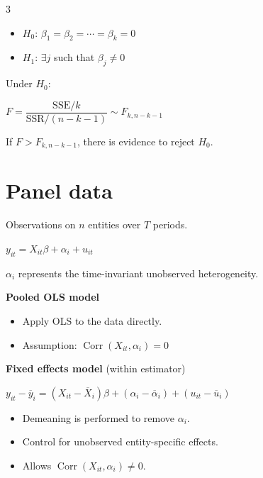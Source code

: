 \documentclass[10pt, a4paper, landscape]{article}
\DeclareMathOperator{\Corr}{Corr}
\newcommand{\SSR}{\text{SSR}}
\newcommand{\SSE}{\text{SSE}}
\begin{document}
\begin{multicols}{3}
\begin{itemize}[leftmargin=*]
	\item \( H_{0} \): \( \beta_{1} = \beta_{2} = \cdots = \beta_{k} = 0 \)
	\item \( H_{1} \): \( \exists j \) such that \( \beta_{j} \neq 0 \)
\end{itemize}

Under \( H_{0} \):

\begin{center}
	\( F = \dfrac{\SSE / k}{\SSR / (n - k - 1)} \sim F_{k, n - k - 1} \)
\end{center}

If \( F > F_{k, n - k - 1} \), there is evidence to reject \( H_{0} \).

\columnbreak

\section*{Panel data}

Observations on \( n \) entities over \( T \) periods.

\begin{center}
	\( y_{it} = X_{it} \beta + \alpha_{i} + u_{it} \)
\end{center}

\( \alpha_{i} \) represents the time-invariant unobserved heterogeneity.

\textbf{Pooled OLS model}

\begin{itemize}[leftmargin=*]
	\item Apply OLS to the data directly.
	\item Assumption: \( \Corr(X_{it}, \alpha_{i}) = 0 \)
\end{itemize}

\textbf{Fixed effects model} (within estimator)

\begin{center}
	\( y_{it} - \overline{y}_{i} = (X_{it} - \overline{X}_{i}) \beta + (\alpha_{i} - \overline{\alpha}_{i}) + (u_{it} - \overline{u}_{i}) \)
\end{center}

\begin{itemize}[leftmargin=*]
	\item Demeaning is performed to remove \( \alpha_{i} \).
	\item Control for unobserved entity-specific effects.
	\item Allows \( \Corr(X_{it}, \alpha_{i}) \neq 0 \).
\end{itemize}


\end{multicols}
\end{document}
